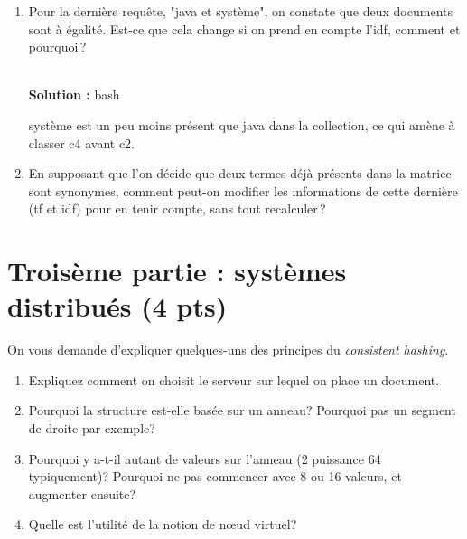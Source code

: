 \documentclass[11pt,a4paper]{article}
\newenvironment{solution}[0]{
~\\ \color{red} \textbf{Solution : }\color{black}}{%
}
\begin{document}
\begin{enumerate}
\begin{solution}
\begin{itemize}
  \item nosql et analyse\,: 
  
    c2 : $\frac{1+1}{\sqrt{3}}$; 
    c4 :  $\frac{1+1}{\sqrt{3}}$  
    c5 : $\frac{1}{\sqrt{6}}$; 

  \item java et système
  
    c1 : $\frac{1+1}{\sqrt{2}}$; 
    c2 : $\frac{1}{\sqrt{3}}$;
    c3 :  $\frac{2}{\sqrt{3}}$  
    c4 :  $\frac{1}{\sqrt{3}}$  
    c5 : $\frac{1+2}{\sqrt{6}}$; 
    
 \end{itemize}

\end{solution}  

   \item Pour la dernière requête, "java et système", on constate que deux
     documents sont à égalité. Est-ce que cela change 
   si on prend en compte l'idf, comment et pourquoi\,?
   
\begin{solution}
bash

système est un peu moins présent que java dans la collection, ce qui amène à classer
c4 avant c2.
\end{solution}

\item En supposant que l'on décide que deux
   termes déjà présents dans la matrice sont synonymes, comment peut-on modifier
    les informations de cette dernière (tf et idf) pour en tenir compte, sans tout recalculer\,?

\end{enumerate}


\section*{Troisème partie : systèmes distribués (4 pts)}

On vous demande d'expliquer quelques-uns des principes du \textit{consistent hashing}. 

\begin{enumerate}
   \item Expliquez comment on choisit le serveur sur lequel on place un document.
  \item Pourquoi la structure est-elle basée sur un anneau? Pourquoi pas un segment de droite par exemple?
  \item Pourquoi y a-t-il autant de valeurs sur l'anneau (2 puissance 64 typiquement)? Pourquoi ne pas commencer
      avec 8 ou 16 valeurs, et augmenter ensuite?
   \item Quelle est l'utilité de la notion de n{\oe}ud virtuel?
\end{enumerate}
\end{document}

